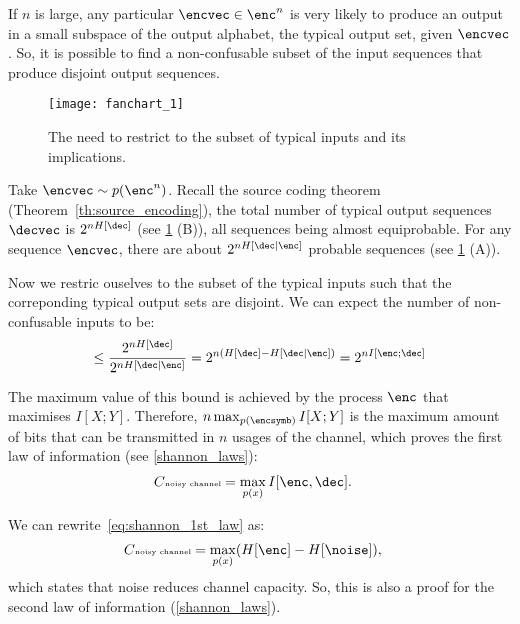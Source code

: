If \(n\) is large, any particular \(\encvec \in \enc^n\) is very likely to produce an output in a small subspace of the output alphabet, the typical output set, given \(\encvec\). So, it is possible to find a non-confusable subset of the input sequences that produce disjoint output sequences.
\begin{figure}
	[ht!] \centering
	\texttt{[image: fanchart\_1]}
	\caption{The need to restrict to the subset of typical inputs and its implications.}\label{fig:fan}
\end{figure}
Take \(\encvec \sim p(\enc^n)\). Recall the source coding theorem (Theorem~\ref{th:source_encoding}), the total number of typical output sequences \(\decvec\) is \(2^{nH[\dec]}\) (see \cref{fig:fan} (B)), all sequences being almost equiprobable. For any sequence \(\encvec\), there are about \(2^{nH[\dec|\enc]}\) probable sequences (see \cref{fig:fan} (A)).

Now we restric ouselves to the subset of the typical inputs such that the correponding typical output sets are disjoint. We can expect the number of non-confusable inputs to be:
\begin{align}
	\leq \frac{2^{nH[\dec]}}{2^{nH[\dec|\enc]}}=2^{n(H[\dec]-H[\dec|\enc])}=2^{nI[\enc;\dec]}
\end{align}

The maximum value of this bound is achieved by the process \(\enc\) that maximises \(I[X;Y]\). Therefore, \(n \max_{p(\encsymb)}I[X;Y]\) is the maximum amount of bits that can be transmitted in \(n\) usages of the channel, which proves the first law of information (see \cref{shannon_laws}):
\begin{align}
	C\text{\tiny{noisy channel}} &= \max_{p(x)} I[\enc,\dec]\label{eq:shannon_1st_law} .
\end{align}

We can rewrite~\eqref{eq:shannon_1st_law} as:
\begin{align}
	C\text{\tiny{noisy channel}} &= \max_{p(x)} (H[\enc]-H[\noise])\label{eq:2nd_law} ,
\end{align}
which states that noise reduces channel capacity. So, this is also a proof for the second law of information (\cref{shannon_laws}).

%


